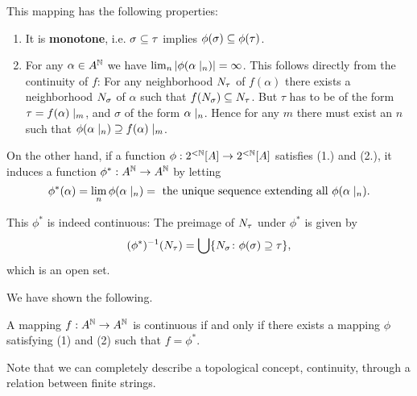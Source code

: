 This mapping has the following properties:

\begin{enumerate}
\item It is \textbf{monotone}, i.e. $\sigma \subseteq \tau$ implies $\phi(\sigma) \subseteq \phi(\tau)$.
\item For any $\alpha \in A^{\mathbb{N}}$ we have $\lim_n |\phi(\alpha\mid_{n})| = \infty$.
This follows directly from the continuity of $f$: For any neighborhood $N_{\tau}$ of $f(\alpha)$ there exists a neighborhood $N_{\sigma}$ of $\alpha$ such that $f(N_{\sigma}) \subseteq N_{\tau}$. But $\tau$ has to be of the form $\tau = f(\alpha)\mid_{m}$, and $\sigma$ of the form $\alpha\mid_{n}$. Hence for any $m$ there must exist an $n$ such that $\phi(\alpha\mid_{n}) \supseteq f(\alpha)\mid_{m}$.
\end{enumerate}

On the other hand, if a function $\phi: 2^{<\mathbb{N}}[A] \to 2^{<\mathbb{N}}[A]$ satisfies (1.) and (2.), it induces a function $\phi^*: A^{\mathbb{N}} \to A^{\mathbb{N}}$ by letting
\begin{equation*}
\phi^*(\alpha) = \lim_n \phi(\alpha\mid_{n}) = \text{ the unique sequence extending all $\phi(\alpha\mid_{n})$}.
\end{equation*}

This $\phi^*$ is indeed continuous: The preimage of $N_{\tau}$ under $\phi^*$ is given by
\begin{equation*}
(\phi^*)^{-1}(N_{\tau}) = \bigcup \{N_{\sigma} \colon \phi(\sigma) \supseteq \tau \},
\end{equation*}
which is an open set.

We have shown the following.

\begin{proposition}\label{prop-product-continuous}A mapping $f:A^{\mathbb{N}} \to A^{\mathbb{N}}$ is continuous if and only if there exists a mapping $\phi$ satisfying (1) and (2) such that $f = \phi^*$.

\end{proposition}Note that we can completely describe a topological concept, continuity, through a relation between finite strings.